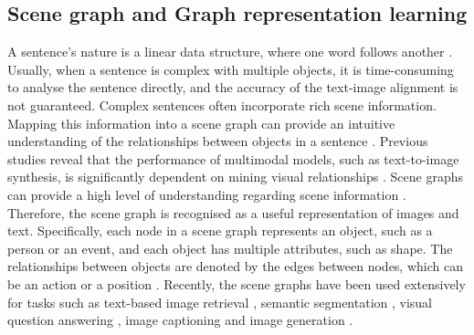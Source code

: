 \documentclass{article}
\begin{document}
\subsection{Scene graph and Graph representation learning}
A sentence’s nature is a linear data structure, where one word follows another \cite{Johnson2018ImageGF}. Usually, when a sentence is complex with multiple objects, it is time-consuming to analyse the sentence directly, and the accuracy of the text-image alignment is not guaranteed. Complex sentences often incorporate rich scene information. Mapping this information into a scene graph can provide an intuitive understanding of the relationships between objects in a sentence \cite{mittal2019interactive}. Previous studies reveal that the performance of multimodal models, such as text-to-image synthesis, is significantly dependent on mining visual relationships \cite{Zhu2022SceneGG}. Scene graphs can provide a high level of understanding regarding scene information \cite{Johnson2018ImageGF}. Therefore, the scene graph is recognised as a useful representation of images and text. Specifically, each node in a scene graph represents an object, such as a person or an event, and each object has multiple attributes, such as shape. The relationships between objects are denoted by the edges between nodes, which can be an action or a position \cite{Chang2021ACS}. Recently, the scene graphs have been used extensively for tasks such as text-based image retrieval \cite{Johnson2015ImageRU, Schuster2015GeneratingSP}, semantic segmentation \cite{Taghanaki2020DeepSS, Jaritz2020xMUDACU}, visual question answering \cite{Li2019RelationAwareGA}, image captioning \cite{Gao2018ImageCW, Yang2019AutoEncodingSG, Zhong2020ComprehensiveIC, Gu2019UnpairedIC} and image generation \cite{Johnson2018ImageGF, mittal2019interactive, li2019pastegan, zhao2019image}. 
\end{document}
